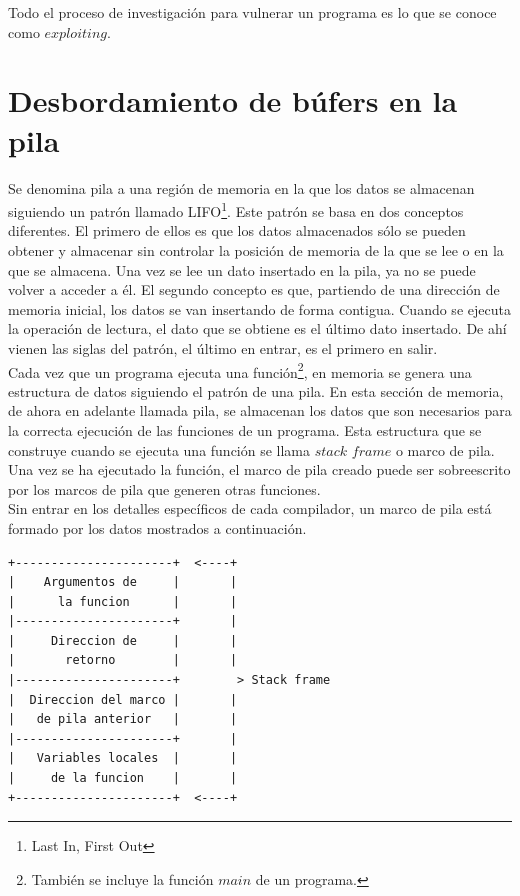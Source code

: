 \documentclass [titlepage, 12pt]{article}
\begin{document}
Todo el proceso de investigaci\'on para vulnerar un programa es lo que se conoce como $exploiting$.

\pagebreak

\section{Desbordamiento de b\'ufers en la pila}

Se denomina pila a una regi\'on de memoria en la que los datos se almacenan siguiendo un patr\'on llamado LIFO\footnote{Last In, First Out}. Este patr\'on se basa en dos conceptos diferentes. El primero de ellos es que los datos almacenados s\'olo se pueden obtener y almacenar sin controlar la posici\'on de memoria de la que se lee o en la que se almacena. Una vez se lee un dato insertado en la pila, ya no se puede volver a acceder a \'el. El segundo concepto es que, partiendo de una direcci\'on de memoria inicial, los datos se van insertando de forma contigua. Cuando se ejecuta la operaci\'on de lectura, el dato que se obtiene es el \'ultimo dato insertado. De ah\'i vienen las siglas del patr\'on, el \'ultimo en entrar, es el primero en salir.\\

Cada vez que un programa ejecuta una funci\'on\footnote{Tambi\'en se incluye la funci\'on $main$ de un programa.}, en memoria se genera una estructura de datos siguiendo el patr\'on de una pila. En esta secci\'on de memoria, de ahora en adelante llamada pila, se almacenan los datos que son necesarios para la correcta ejecuci\'on de las funciones de un programa. Esta estructura que se construye cuando se ejecuta una funci\'on se llama $stack$ $frame$ o marco de pila. Una vez se ha ejecutado la funci\'on, el marco de pila creado puede ser sobreescrito por los marcos de pila que generen otras funciones. \\
Sin entrar en los detalles espec\'ificos de cada compilador, un marco de pila est\'a formado por los datos mostrados a continuaci\'on. \bigskip

\begin{verbatim}
+----------------------+  <----+
|    Argumentos de     |       |
|      la funcion      |       |
|----------------------+       |
|     Direccion de     |       |
|       retorno        |       |
|----------------------+        > Stack frame
|  Direccion del marco |       |
|   de pila anterior   |       |
|----------------------+       |
|   Variables locales  |       |
|     de la funcion    |       |
+----------------------+  <----+
\end{verbatim}
\bigskip
\end{document}
